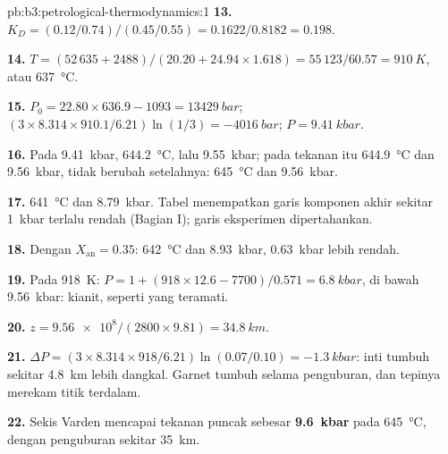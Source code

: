 \begin{solution}{pb:b3:petrological-thermodynamics:1}
\textbf{13.} $K_D = (0.12/0.74)/(0.45/0.55) = 0.1622/0.8182 = 0.198$.

\textbf{14.} $T = (52\,635 + 2488)/(20.20 + 24.94\times1.618) = 55\,123/60.57
= \qty{910}{K}$, atau \qty{637}{\celsius}.

\textbf{15.} $P_0 = 22.80\times636.9 - 1093 = \qty{13429}{bar}$; $(3\times8.314
\times910.1/6.21)\ln(1/3) = \qty{-4016}{bar}$; $P = \qty{9.41}{kbar}$.

\textbf{16.} Pada \qty{9.41}{kbar}, \qty{644.2}{\celsius}, lalu
\qty{9.55}{kbar}; pada tekanan itu \qty{644.9}{\celsius} dan
\qty{9.56}{kbar}, tidak berubah setelahnya: \qty{645}{\celsius} dan
\qty{9.56}{kbar}.

\textbf{17.} \qty{641}{\celsius} dan \qty{8.79}{kbar}. Tabel menempatkan
garis komponen akhir sekitar \qty{1}{kbar} terlalu rendah (Bagian I); garis
eksperimen dipertahankan.

\textbf{18.} Dengan $X_{\text{an}} = 0.35$: \qty{642}{\celsius} dan
\qty{8.93}{kbar}, \qty{0.63}{kbar} lebih rendah.

\textbf{19.} Pada \qty{918}{K}: $P = 1 + (918\times12.6 - 7700)/0.571 =
\qty{6.8}{kbar}$, di bawah \qty{9.56}{kbar}: kianit, seperti yang teramati.

\textbf{20.} $z = \num{9.56e8}/(2800\times9.81) = \qty{34.8}{km}$.

\textbf{21.} $\Delta P = (3\times8.314\times918/6.21)\ln(0.07/0.10) =
\qty{-1.3}{kbar}$: inti tumbuh sekitar \qty{4.8}{km} lebih dangkal. Garnet
tumbuh selama penguburan, dan tepinya merekam titik terdalam.

\textbf{22.} Sekis Varden mencapai tekanan puncak sebesar
\textbf{\qty[text-series-to-math=true]{9.6}{kbar}} pada
\qty{645}{\celsius}, dengan penguburan sekitar \qty{35}{km}.
\end{solution}
